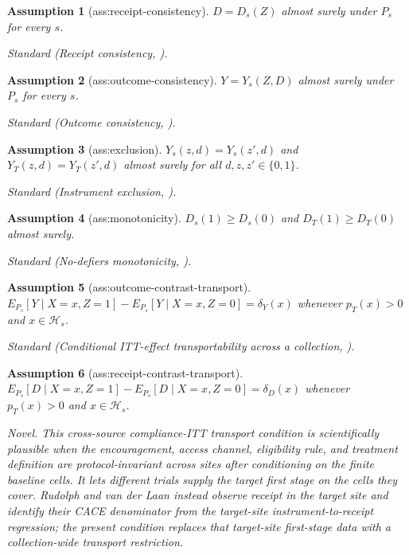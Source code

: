 \documentclass{article}
\newtheorem{assumption}{Assumption}
\begin{document}
\begin{assumption}[ass:receipt-consistency]\label{ass:receipt-consistency}
\(D=D_s(Z)\) almost surely under \(P_s\) for every \(s\).
\par\smallskip\noindent\emph{Standard} (Receipt consistency, \cite{ImbensAngrist1994}).
\end{assumption}

\begin{assumption}[ass:outcome-consistency]\label{ass:outcome-consistency}
\(Y=Y_s(Z,D)\) almost surely under \(P_s\) for every \(s\).
\par\smallskip\noindent\emph{Standard} (Outcome consistency, \cite{RudolphVanderLaan2017}).
\end{assumption}

\begin{assumption}[ass:exclusion]\label{ass:exclusion}
\(Y_s(z,d)=Y_s(z',d)\) and \(Y_T(z,d)=Y_T(z',d)\) almost surely for all \(d,z,z'\in\{0,1\}\).
\par\smallskip\noindent\emph{Standard} (Instrument exclusion, \cite{RudolphVanderLaan2017}).
\end{assumption}

\begin{assumption}[ass:monotonicity]\label{ass:monotonicity}
\(D_s(1)\ge D_s(0)\) and \(D_T(1)\ge D_T(0)\) almost surely.
\par\smallskip\noindent\emph{Standard} (No-defiers monotonicity, \cite{ImbensAngrist1994}).
\end{assumption}

\begin{assumption}[ass:outcome-contrast-transport]\label{ass:outcome-contrast-transport}
\(E_{P_s}[Y\mid X=x,Z=1]-E_{P_s}[Y\mid X=x,Z=0]=\delta_Y(x)\) whenever \(p_T(x)>0\) and \(x\in\mathcal H_s\).
\par\smallskip\noindent\emph{Standard} (Conditional ITT-effect transportability across a collection, \cite{DahabrehRobertsonPetitoHernanSteingrimsson2023}).
\end{assumption}

\begin{assumption}[ass:receipt-contrast-transport]\label{ass:receipt-contrast-transport}
\(E_{P_s}[D\mid X=x,Z=1]-E_{P_s}[D\mid X=x,Z=0]=\delta_D(x)\) whenever \(p_T(x)>0\) and \(x\in\mathcal H_s\).
\par\smallskip\noindent\emph{Novel.} This cross-source compliance-ITT transport condition is scientifically plausible when the encouragement, access channel, eligibility rule, and treatment definition are protocol-invariant across sites after conditioning on the finite baseline cells. It lets different trials supply the target first stage on the cells they cover. Rudolph and van der Laan instead observe receipt in the target site and identify their CACE denominator from the target-site instrument-to-receipt regression; the present condition replaces that target-site first-stage data with a collection-wide transport restriction.
\end{assumption}
\end{document}
